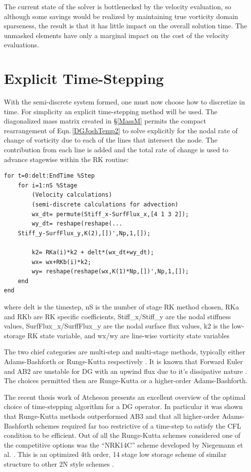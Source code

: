 \documentclass[letterpaper,12pt]{report}
\begin{document}
The current state of the solver is bottlenecked by the velocity evaluation, so although some savings would be realized by maintaining true vorticity domain sparseness, the result is that it has little impact on the overall solution time. The unmasked elements have only a marginal impact on the cost of the velocity evaluations.

%
\section{Explicit Time-Stepping}\label{TimeStep}
With the semi-discrete system formed, one must now choose how to discretize in time. For simplicity an explicit time-stepping method will be used. The diagonalized mass matrix created in \S\ref{MassM} permits the compact rearrangement of Eqn.\,\eqref{DGJoshTemp2} to solve explicitly for the nodal rate of change of vorticity due to each of the lines that intersect the node. The contribution from each line is added and the total rate of change is used to advance stagewise within the RK routine:

\singlespacing
\begin{lstlisting}
for t=0:delt:EndTime %Step
    for i=1:nS %Stage
        (Velocity calculations)
        (semi-discrete calculations for advection)
        wx_dt= permute(Stiff_x-SurfFlux_x,[4 1 3 2]);
        wy_dt= reshape(reshape(...
	Stiff_y-SurfFlux_y,K(2),[])',Np,1,[]);
        
        k2= RKa(i)*k2 + delt*(wx_dt+wy_dt);
        wx= wx+RKb(i)*k2;
        wy= reshape(reshape(wx,K(1)*Np,[])',Np,1,[]);
    end
end
\end{lstlisting}
\doublespacing

where delt is the timestep, nS is the number of stage RK method chosen, RKa and RKb are RK specific coefficients, Stiff\_x/Stiff\_y are the nodal stiffness values, SurfFlux\_x/SurffFlux\_y are the nodal surface flux values, k2 is the low-storage RK state variable, and wx/wy are line-wise vorticity state variables

The two chief categories are multi-step and multi-stage methods, typically either Adams-Bashforth or Runge-Kutta respectively \cite{ButcherSurvey}. It is known that Forward Euler and AB2 are unstable for DG with an upwind flux due to it's dissipative nature \cite{Reid}. The choices permitted then are Runge-Kutta or a higher-order Adams-Bashforth.

The recent thesis work of Atcheson \cite{Reid} presents an excellent overview of the optimal choice of time-stepping algorithm for a DG operator. In particular it was shown that Runge-Kutta methods outperformed AB3 and that all higher-order Adams-Bashforth schemes required far too restrictive of a time-step to satisfy the CFL condition to be efficient. Out of all the Runge-Kutta schemes considered \cite{Toulorge} one of the competitive options was the ``NRK14C'' scheme developed by Niegemann et al. \cite{Niegemann}. This is an optimized 4th order, 14 stage low storage scheme of similar structure to other 2N style schemes \cite{Carpenter}.
\end{document}

